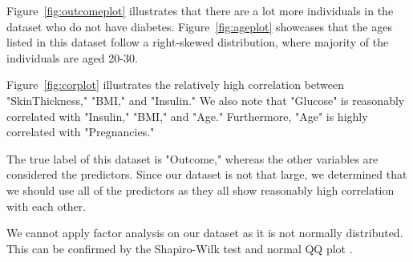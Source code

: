 \documentclass[12pt]{article}
\begin{document}
\begin{indent}
\onehalfspacing	
	
Figure~\ref{fig:outcomeplot} illustrates that there are a lot more individuals in the dataset who do not have diabetes. Figure~\ref{fig:ageplot} showcases that the ages listed in this dataset follow a right-skewed distribution, where majority of the individuals are aged 20-30.

Figure~\ref{fig:corplot} illustrates the relatively high correlation between "SkinThickness," "BMI," and "Insulin." We also note that "Glucose" is reasonably correlated with "Insulin," "BMI," and "Age." Furthermore, "Age" is highly correlated with "Pregnancies."

The true label of this dataset is "Outcome," whereas the other variables are considered the predictors. Since our dataset is not that large, we determined that we should use all of the predictors as they all show reasonably high correlation with each other. 

We cannot apply factor analysis on our dataset as it is not normally distributed. This can be confirmed by the Shapiro-Wilk test and normal QQ plot \citep{Rlang}.
\end{indent}
\end{document}
